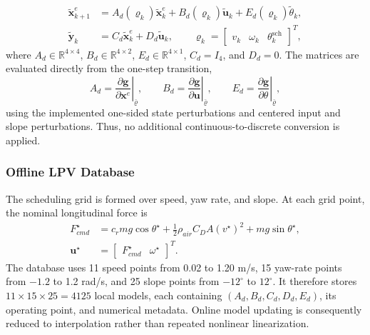 \documentclass{ieeeaccess}
\begin{document}
\begin{align}
\widetilde{\bm{x}}^{e}_{k+1}
&=A_d(\boldsymbol\varrho_k)\widetilde{\bm{x}}^{e}_k
+B_d(\boldsymbol\varrho_k)\widetilde{\bm{u}}_k
+E_d(\boldsymbol\varrho_k)\widetilde\theta_k,\nonumber\\
\widetilde{\bm y}_k&=C_d\widetilde{\bm x}^e_k+D_d\widetilde{\bm u}_k,
\qquad
\boldsymbol\varrho_k=
\begin{bmatrix}v_k&\omega_k&\theta^{\mathrm{sch}}_k\end{bmatrix}^{T},
\label{eq:lpv_state}
\end{align}
where $A_d\in\mathbb R^{4\times4}$, $B_d\in\mathbb R^{4\times2}$, $E_d\in\mathbb R^{4\times1}$, $C_d=I_4$, and $D_d=0$. The matrices are evaluated directly from the one-step transition,
\begin{equation}
A_d=\left.\frac{\partial\bm g}{\partial\bm x^e}\right|_{\bar{\boldsymbol\varrho}},
\qquad
B_d=\left.\frac{\partial\bm g}{\partial\bm u}\right|_{\bar{\boldsymbol\varrho}},
\qquad
E_d=\left.\frac{\partial\bm g}{\partial\theta}\right|_{\bar{\boldsymbol\varrho}},
\label{eq:discrete_transition_jacobians}
\end{equation}
using the implemented one-sided state perturbations and centered input and slope perturbations. Thus, no additional continuous-to-discrete conversion is applied.

\subsubsection{Offline LPV Database}

The scheduling grid is formed over speed, yaw rate, and slope. At each grid point, the nominal longitudinal force is
\begin{equation}
\begin{aligned}
F_{cmd}^{\star}
&=c_rmg\cos\theta^{\star}
+\frac{1}{2}\rho_{air}C_DA(v^{\star})^2
+mg\sin\theta^{\star},\\
\bm u^{\star}
&=\begin{bmatrix}F_{cmd}^{\star}&\omega^{\star}\end{bmatrix}^{T}.
\end{aligned}
\label{eq:workpoint_force}
\end{equation}
The database uses 11 speed points from 0.02 to 1.20 m/s, 15 yaw-rate points from $-1.2$ to 1.2 rad/s, and 25 slope points from $-12^{\circ}$ to $12^{\circ}$. It therefore stores $11\times15\times25=4125$ local models, each containing $(A_d,B_d,C_d,D_d,E_d)$, its operating point, and numerical metadata. Online model updating is consequently reduced to interpolation rather than repeated nonlinear linearization.
\end{document}
